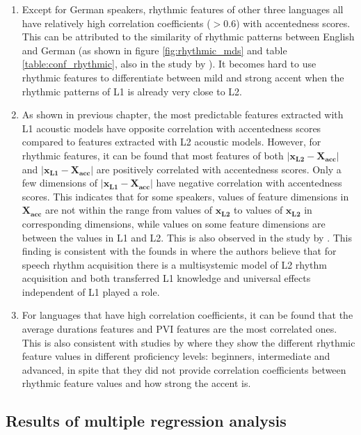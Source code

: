 \begin{enumerate}
\item Except for German speakers, rhythmic features of other three languages all have relatively high correlation coefficients ($>$0.6) with accentedness scores. This can be attributed to the similarity of rhythmic patterns between English and German (as shown in figure \ref{fig:rhythmic_mds} and table \ref{table:conf_rhythmic}, also in the study by \cite{li2014l2}). It becomes hard to use rhythmic features to differentiate between mild and strong accent when the rhythmic patterns of L1 is already very close to L2.
\item As shown in previous chapter, the most predictable features extracted with L1 acoustic models have opposite correlation with accentedness scores compared to features extracted with L2 acoustic models. However, for rhythmic features, it can be found that most features of both $\left| \mathbf{x_{L2}}-\mathbf{X_{acc}} \right|$ and $\left| \mathbf{x_{L1}}- \mathbf{X_{acc}} \right|$ are positively correlated with accentedness scores. Only a few dimensions of $\left| \mathbf{x_{L1}}- \mathbf{X_{acc}} \right|$ have negative correlation with accentedness scores. This indicates that for some speakers, values of feature dimensions in $\mathbf{X_{acc}}$ are not within the range from values of $\mathbf{x_{L2}}$ to values of $\mathbf{x_{L2}}$ in corresponding dimensions, while values on some feature dimensions are between the values in L1 and L2. This is also observed in the study by \cite{white2007calibrating}. This finding is consistent with the founds in \citep{li2014l2} where the authors believe that for speech rhythm acquisition there is a multisystemic model of L2 rhythm acquisition and both transferred L1 knowledge and universal effects independent of L1 played a role.
\item For languages that have high correlation coefficients, it can be found that the average durations features and PVI features are the most correlated ones. This is also consistent with studies by \cite{ordin2015acquisition} where they show the different rhythmic feature values in different proficiency levels: beginners, intermediate and advanced, in spite that they did not provide correlation coefficients between rhythmic feature values and how strong the accent is.
\end{enumerate}

\subsection{Results of multiple regression analysis}

